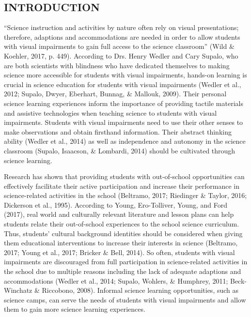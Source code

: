 \documentclass[11.5pt]{sig-alternate} %
\begin{document}
\begin{large}
\section*{INTRODUCTION}

“Science instruction and activities by nature often rely on visual presentations; therefore, adaptions and accommodations are needed in order to allow students with visual impairments to gain full access to the science classroom” (Wild \& Koehler, 2017, p. 449). According to Drs. Henry Wedler and Cary Supalo, who are both scientists with blindness who have dedicated themselves to making science more accessible for students with visual impairments, hands-on learning is crucial in science education for students with visual impairments (Wedler et al., 2012; Supalo, Dwyer, Eberhart, Bunnag, \& Mallouk, 2009). Their personal science learning experiences inform the importance of providing tactile materials and assistive technologies when teaching science to students with visual impairments. Students with visual impairments need to use their other senses to make observations and obtain firsthand information. Their abstract thinking ability (Wedler et al., 2014) as well as independence and autonomy in the science classroom (Supalo, Isaacson, \& Lombardi, 2014) should be cultivated through science learning.

Research has shown that providing students with out-of-school opportunities can effectively facilitate their active participation and increase their performance in science-related activities in the school (Beltramo, 2017; Riedinger \& Taylor, 2016; Dickerson et al., 1995). According to Young, Ero-Tolliver, Young, and Ford (2017), real world and culturally relevant literature and lesson plans can help students relate their out-of-school experiences to the school science curriculum. Thus, students’ cultural background identities should be considered when giving them educational interventions to increase their interests in science (Beltramo, 2017; Young et al., 2017; Bricker \& Bell, 2014). So often, students with visual impairments are discouraged from full participation in science-related activities in the school due to multiple reasons including the lack of adequate adaptions and accommodations (Wedler et al., 2014; Supalo, Wohlers, \& Humphrey, 2011; Beck-Winchatz \& Riccobono, 2008). Informal science learning opportunities, such as science camps, can serve the needs of students with visual impairments and allow them to gain more science learning experiences.


\end{large}
\end{document}
